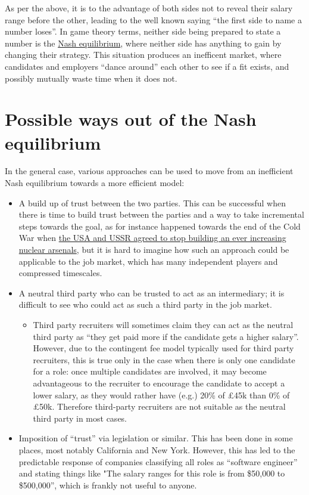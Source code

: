 \documentclass[a4paper]{article}
\begin{document}
As per the above, it is to the advantage of both sides not to reveal their salary range before the other, leading to the well known saying ``the first side to name a number loses''. In game theory terms, neither side being prepared to state a number is the \href{https://en.wikipedia.org/wiki/Nash\_equilibrium}{Nash equilibrium}, where neither side has anything to gain by changing their strategy. This situation produces an inefficent market, where candidates and employers ``dance around'' each other to see if a fit exists, and possibly mutually waste time when it does not.

\section{Possible ways out of the Nash equilibrium}

In the general case, various approaches can be used to move from an inefficient Nash equilibrium towards a more efficient model:

\begin{itemize}
\item A build up of trust between the two parties. This can be successful when there is time to build trust between the parties and a way to take incremental steps towards the goal, as for instance happened towards the end of the Cold War when \href{https://en.wikipedia.org/wiki/START\_I}{the USA and USSR agreed to stop building an ever increasing nuclear arsenals}, but it is hard to imagine how such an approach could be applicable to the job market, which has many independent players and compressed timescales.
\item A neutral third party who can be trusted to act as an intermediary; it is difficult to see who could act as such a third party in the job market.
  \begin{itemize}
  \item Third party recruiters will sometimes claim they can act as the neutral third party as ``they get paid more if the candidate gets a higher salary''. However, due to the contingent fee model typically used for third party recruiters, this is true only in the case when there is only one candidate for a role: once multiple candidates are involved, it may become advantageous to the recruiter to encourage the candidate to accept a lower salary, as they would rather have (e.g.) 20\% of £45k than 0\% of £50k. Therefore third-party recruiters are not suitable as the neutral third party in most cases.
  \end{itemize}
\item Imposition of ``trust'' via legislation or similar. This has been done in some places, most notably California and New York. However, this has led to the predictable response of companies classifying all roles as ``software engineer'' and stating things like "The salary ranges for this role is from \$50,000 to \$500,000'', which is frankly not useful to anyone.
\end{itemize}
\end{document}
